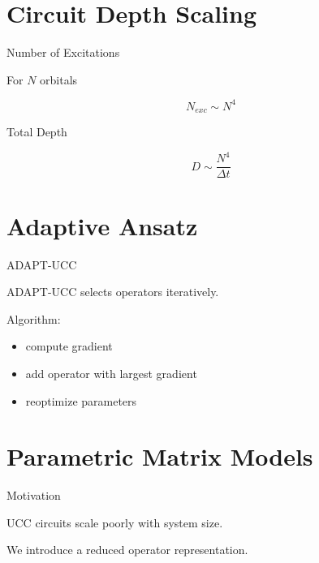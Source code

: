 \documentclass{beamer}
\begin{document}
\section{Circuit Depth Scaling}

\begin{frame}{Number of Excitations}

  For $N$ orbitals

  \[
  N_{exc} \sim N^4
  \]

\end{frame}

\begin{frame}{Total Depth}

  \[
  D \sim \frac{N^4}{\Delta t}
  \]

\end{frame}

\section{Adaptive Ansatz}

\begin{frame}{ADAPT-UCC}

  ADAPT-UCC selects operators iteratively.

  Algorithm:

  \begin{itemize}
  \item compute gradient
  \item add operator with largest gradient
  \item reoptimize parameters
  \end{itemize}

\end{frame}

\section{Parametric Matrix Models}

\begin{frame}{Motivation}

  UCC circuits scale poorly with system size.

  We introduce a reduced operator representation.

\end{frame}
\end{document}
